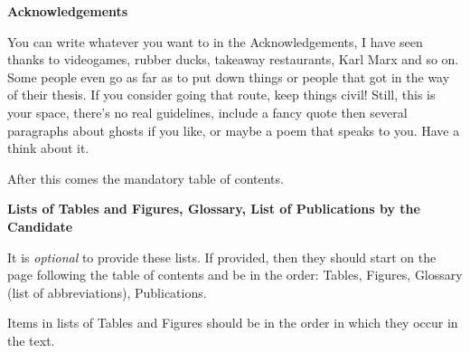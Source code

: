 \noindent
{\LARGE\textbf{Acknowledgements}}
\vspace{1cm}

\begin{spacing}{1} 
\noindent
You can write whatever you want to in the Acknowledgements, I have seen thanks to videogames, rubber ducks, takeaway restaurants, Karl Marx and so on. Some people even go as far as to put down things or people that got in the way of their thesis. If you consider going that route, keep things civil! Still, this is your space, there's no real guidelines, include a fancy quote then several paragraphs about ghosts if you like, or maybe a poem that speaks to you. Have a think about it. 



After this comes the mandatory table of contents. 

\textbf{Lists of Tables and Figures, Glossary, List of Publications by the Candidate}

It is \textit{optional} to provide these lists. If provided, then they should start on the page following the table of contents and be in the order: Tables, Figures, Glossary (list of abbreviations), Publications.  

Items in lists of Tables and Figures should be in the order in which they occur in the text.
\end{spacing}
